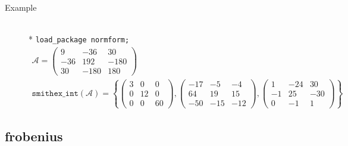 \begin{description}
\item[Example]\mbox{}\\*
\texttt{load\_package normform;}
\begin{gather*}
 \mathcal{A} =
    \begin{pmatrix} 9 & -36 & 30 \\ -36 & 192 & -180 \\ 30 & -180 & 180 \end{pmatrix} \\[2mm]
\mathtt{smithex\_int}(\mathcal{A}) = 
\left\{ \begin{pmatrix} 3 & 0 & 0 \\ 0 & 12 & 0 \\ 0 & 0 & 60 \end{pmatrix},
        \begin{pmatrix} -17 & -5 & -4 \\ 64 & 19 & 15 \\ -50 & -15 & -12 \end{pmatrix},
        \begin{pmatrix} 1 & -24 & 30 \\ -1 & 25 & -30 \\ 0 & -1 & 1 \end{pmatrix} \right\}
\end{gather*}
\end{description}

\subsection{frobenius}

